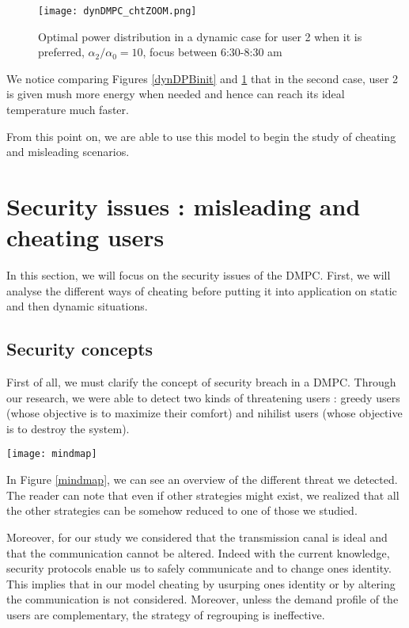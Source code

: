 \documentclass[conference, peerreview]{IEEEtran}
\edef\hc{\string:}
\begin{document}
\begin{figure}[H]
\centering
\texttt{[image: dynDMPC\_chtZOOM.png]}
\caption{Optimal power distribution in a dynamic case for user 2 when it is preferred, $\alpha_2 / \alpha_0 = 10$, focus between 6\hc 30-8\hc 30 am }
\label{dynDPBcom}
\end{figure}
 We notice comparing Figures \ref{dynDPBinit} and \ref{dynDPBcom} that in the second case, user 2 is given mush more energy when needed and hence can reach its ideal temperature much faster.

From this point on, we are able to use this model to begin the study of cheating and misleading scenarios.
  
\section{Security issues : misleading and cheating users}
In this section, we will focus on the security issues of the DMPC. First, we will analyse the different ways of cheating before putting it into application on static and then dynamic situations. 

\subsection{Security concepts}
First of all, we must clarify the concept of security breach in a DMPC. Through our research, we were able to detect two kinds of threatening users : greedy users (whose objective is to maximize their comfort) and nihilist users (whose objective is to destroy the system). 

 \begin{figure*}[!t]
\centering
\texttt{[image: mindmap]}
\caption{Overview of different threatening methods}
\label{mindmap}
\end{figure*}

In Figure \ref{mindmap}, we can see an overview of the different threat we detected. The reader can note that even if other strategies might exist, we realized  that all the other strategies can be somehow reduced to one of those we studied. 

Moreover, for our study we considered that the transmission canal is ideal and that the communication cannot be altered. Indeed with the current knowledge, security protocols enable us to safely communicate and to change ones identity. This implies that in our model cheating by usurping ones identity or by altering the communication is not considered. Moreover, unless the demand profile of the users are complementary, the strategy of regrouping is ineffective. \\
\end{document}
